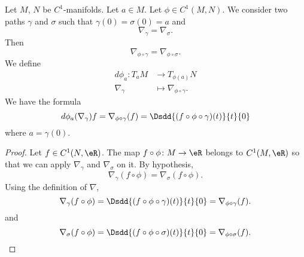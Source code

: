 \begin{propositionDef}      \label{DEFooDRGUooDPFIJa}
	Let \( M\), \( N\) be \( C^1\)-manifolds. Let \( a\in M\). Let \( \phi\in C^1(M,N)\). We consider two paths \( \gamma\) and \( \sigma\) such that \( \gamma(0)=\sigma(0)=a\) and
	\begin{equation}
		\nabla_{\gamma}=\nabla_{\sigma}.
	\end{equation}
	Then
	\begin{equation}
		\nabla_{\phi\circ \gamma}=\nabla_{\phi\circ \sigma}.
	\end{equation}
	We define
	\begin{equation}        \label{EQooQNZPooMVaSQC}
		\begin{aligned}
			d\phi_a\colon T_aM & \to T_{\phi(a)}N                   \\
			\nabla_{\gamma}    & \mapsto \nabla_{\phi\circ \gamma}.
		\end{aligned}
	\end{equation}
	We have the formula
	\begin{equation}        \label{EQooEWMRooFsSVpb}
		d\phi_a(\nabla_{\gamma})f=\nabla_{\phi\circ \gamma}(f)=\Dsdd{ (f\circ\phi\circ\gamma)(t) }{t}{0}
	\end{equation}
	where \( a=\gamma(0)\).
\end{propositionDef}

\begin{proof}
	Let \( f\in C^1(N,\eR)\). The map \( f\circ\phi\colon M\to \eR\) belongs to \( C^1(M,\eR)\) so that we can apply \( \nabla_{\gamma}\) and \( \nabla_{\sigma}\) on it. By hypothesis,
	\begin{equation}
		\nabla_{\gamma}(f\circ \phi)=\nabla_{\sigma}(f\circ \phi).
	\end{equation}
	Using the definition of \( \nabla\),
	\begin{equation}
		\nabla_{\gamma}(f\circ\phi)=\Dsdd{ (f\circ \phi\circ \gamma)(t) }{t}{0}=\nabla_{\phi\circ\gamma}(f).
	\end{equation}
	and
	\begin{equation}
		\nabla_{\sigma}(f\circ\phi)=\Dsdd{ (f\circ \phi\circ \sigma)(t) }{t}{0}=\nabla_{\phi\circ\sigma}(f).
	\end{equation}
\end{proof}

